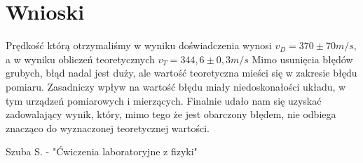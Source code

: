 \documentclass[polish,a4paper]{article}
\begin{document}
\section{Wnioski}
 
Prędkość którą otrzymaliśmy w wyniku doświadczenia wynosi $ v_{D} = 370 \pm 70  m/s$, a w wyniku obliczeń teoretycznych $v_{T} = 344,6 \pm 0,3 m/s$ 
\newline
Mimo usunięcia błędów grubych, błąd nadal jest duży, ale wartość teoretyczna mieści się w zakresie błędu pomiaru. Zasadniczy wpływ na wartość błędu miały niedoskonałości układu, w tym urządzeń pomiarowych i mierzących.
\newline
Finalnie udało nam się uzyskać zadowalający wynik, który, mimo tego że jest obarczony błędem, nie odbiega znacząco do wyznaczonej teoretycznej wartości. 


\begin{thebibliography}{3}
 Szuba S. - "Ćwiczenia laboratoryjne z fizyki"
\end{thebibliography}

\newpage
\tableofcontents{}
\end{document}
